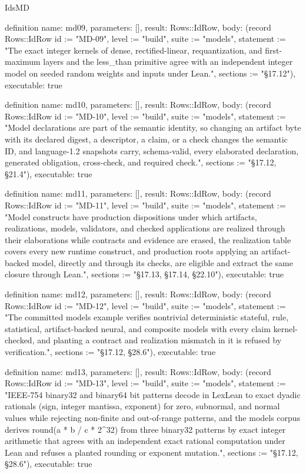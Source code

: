 \begin{lexlean}{IdsMD}
\begin{semanticmodule}
definition{
  name: md09,
  parameters: [],
  result: Rows::IdRow,
  body: (record Rows::IdRow {id := "MD-09", level := "build", suite := "models", statement := "The exact integer kernels of dense, rectified-linear, requantization, and first-maximum layers and the less_than primitive agree with an independent integer model on seeded random weights and inputs under Lean.", sections := "§17.12"}),
  executable: true
}

definition{
  name: md10,
  parameters: [],
  result: Rows::IdRow,
  body: (record Rows::IdRow {id := "MD-10", level := "build", suite := "models", statement := "Model declarations are part of the semantic identity, so changing an artifact byte with its declared digest, a descriptor, a claim, or a check changes the semantic ID, and language-1.2 snapshots carry, schema-valid, every elaborated declaration, generated obligation, cross-check, and required check.", sections := "§17.12, §21.4"}),
  executable: true
}

definition{
  name: md11,
  parameters: [],
  result: Rows::IdRow,
  body: (record Rows::IdRow {id := "MD-11", level := "build", suite := "models", statement := "Model constructs have production dispositions under which artifacts, realizations, models, validators, and checked applications are realized through their elaborations while contracts and evidence are erased, the realization table covers every new runtime construct, and production roots applying an artifact-backed model, directly and through its checks, are eligible and extract the same closure through Lean.", sections := "§17.13, §17.14, §22.10"}),
  executable: true
}

definition{
  name: md12,
  parameters: [],
  result: Rows::IdRow,
  body: (record Rows::IdRow {id := "MD-12", level := "build", suite := "models", statement := "The committed models example verifies nontrivial deterministic stateful, rule, statistical, artifact-backed neural, and composite models with every claim kernel-checked, and planting a contract and realization mismatch in it is refused by verification.", sections := "§17.12, §28.6"}),
  executable: true
}

definition{
  name: md13,
  parameters: [],
  result: Rows::IdRow,
  body: (record Rows::IdRow {id := "MD-13", level := "build", suite := "models", statement := "IEEE-754 binary32 and binary64 bit patterns decode in LexLean to exact dyadic rationals (sign, integer mantissa, exponent) for zero, subnormal, and normal values while rejecting non-finite and out-of-range patterns, and the models corpus derives round(a * b / c * 2^32) from three binary32 patterns by exact integer arithmetic that agrees with an independent exact rational computation under Lean and refuses a planted rounding or exponent mutation.", sections := "§17.12, §28.6"}),
  executable: true
}


\end{semanticmodule}
\end{lexlean}
